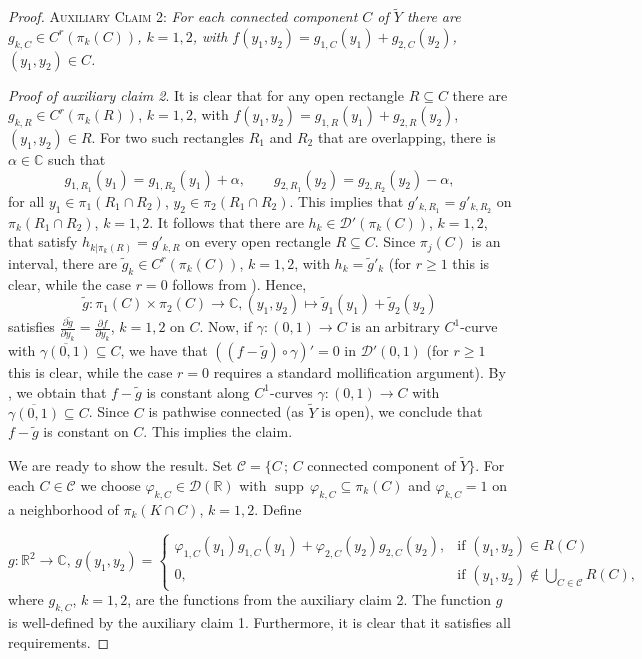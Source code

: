 \documentclass[12pt]{amsart}
\newcommand{\R}{\mathbb{R}}
\newcommand{\C}{\mathbb{C}}
\newcommand{\supp}{\operatorname{supp}\,}
\theoremstyle{definition}
\theoremstyle{remark}
\numberwithin{equation}{section}
\begin{document}
\begin{proof}
	\textsc{Auxiliary Claim 2:} \emph{For each connected component $C$ of $\tilde Y$ there are  $g_{k,C}\in C^r(\pi_k(C))$, $k=1,2$, with $f(y_1,y_2)=g_{1,C}(y_1)+g_{2,C}(y_2)$, $(y_1,y_2)\in C$.}
		
	\emph{Proof of auxiliary claim 2}. It is clear that for any open rectangle $R\subseteq C$ there are $g_{k,R}\in C^r(\pi_k(R))$, $k=1,2$, with $f(y_1,y_2)=g_{1,R}(y_1)+g_{2,R}(y_2)$, $(y_1,y_2)\in R$.  For two such rectangles $R_1$ and $R_2$ that are overlapping, there is $\alpha\in\C$ such that
	$$
	g_{1,R_1}(y_1)=g_{1,R_2}(y_1)+\alpha, \qquad g_{2,R_1}(y_2)=g_{2,R_2}(y_2)-\alpha,
	$$
	for all $y_1\in\pi_1(R_1\cap R_2)$, $y_2\in\pi_2(R_1\cap R_2)$. This implies that $g'_{k,R_1}=g'_{k,R_2}$ on $\pi_k(R_1\cap R_2)$, $k=1,2$. It follows that there are $h_k\in\mathscr{D}'(\pi_k(C))$, $k=1,2$, that satisfy $h_{k|\pi_k(R)}=g'_{k,R}$ on every open rectangle $R\subseteq C$. Since $\pi_j(C)$ is an interval, there are $\tilde{g}_k\in C^r(\pi_k(C))$, $k=1,2$, with $h_k=\tilde{g}'_k$ (for $r \geq 1$ this is clear, while the case $r =0$  follows from   \cite[Exercise 3.1.1 and Corollary 3.1.5]{HoermanderPDO1}). Hence,
	$$\tilde{g}:\pi_1(C)\times\pi_2(C)\rightarrow\C, (y_1,y_2)\mapsto\tilde{g}_1(y_1)+\tilde{g}_2(y_2)$$
	satisfies $\frac{\partial \tilde{g}}{\partial y_k}= \frac{\partial f}{\partial y_k}$, $k = 1,2$ on $C$. Now, if $\gamma:(0,1)\rightarrow C$ is an arbitrary $C^1$-curve with $\overline{\gamma(0,1)}\subseteq C$, we have that   $((f-\tilde{g})\circ\gamma)' = 0$ in  $\mathscr{D}'(0,1)$   (for $r \geq 1$ this is clear, while the case $r =0$ requires a standard mollification argument). By \cite[Theorem 3.1.4]{HoermanderPDO1}, we obtain that  $f-\tilde{g}$  is constant along $C^1$-curves $\gamma:(0,1)\rightarrow C$ with $\overline{\gamma(0,1)}\subseteq C$. Since $C$ is pathwise connected (as $\tilde{Y}$ is open), we conclude that $f-\tilde{g}$ is constant on $C$. This implies the claim.

	We are ready to show the result.  Set $\mathscr{C}=\{C \,; \,C\mbox{ connected component of }\tilde{Y}\}$. For each $C\in\mathscr{C}$ we choose $\varphi_{k,C}\in\mathscr{D}(\R)$ with $\supp\varphi_{k,C}\subseteq\pi_k(C)$ and $\varphi_{k,C}=1$ on a neighborhood of $\pi_k(K\cap C)$, $k=1,2$. Define

	$$g:\R^2\rightarrow\C, \, g(y_1,y_2)=\begin{cases}
		\varphi_{1,C}(y_1)g_{1,C}(y_1)+\varphi_{2,C}(y_2)g_{2,C}(y_2),&\mbox{if }(y_1,y_2)\in R(C)\\
		0,&\mbox{if }(y_1,y_2)\notin \bigcup_{C\in\mathscr{C}}R(C),
	\end{cases}$$
	where $g_{k,C}$, $k=1,2$, are the functions from the auxiliary claim 2. The function $g$ is well-defined by the auxiliary claim 1. Furthermore, it is clear that it satisfies all requirements.
	\end{proof}
\end{document}
